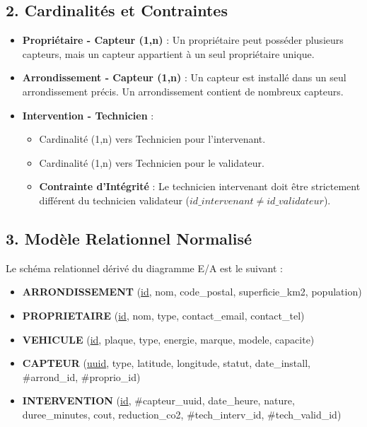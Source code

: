 \documentclass[a4paper,12pt]{article}
\begin{document}
\subsection*{2. Cardinalités et Contraintes}
\begin{itemize}
    \item \textbf{Propriétaire - Capteur (1,n)} : Un propriétaire peut posséder plusieurs capteurs, mais un capteur appartient à un seul propriétaire unique.
    \item \textbf{Arrondissement - Capteur (1,n)} : Un capteur est installé dans un seul arrondissement précis. Un arrondissement contient de nombreux capteurs.
    \item \textbf{Intervention - Technicien} : 
    \begin{itemize}
        \item Cardinalité (1,n) vers Technicien pour l'intervenant.
        \item Cardinalité (1,n) vers Technicien pour le validateur.
        \item \textbf{Contrainte d'Intégrité} : Le technicien intervenant doit être strictement différent du technicien validateur ($id\_intervenant \neq id\_validateur$).
    \end{itemize}
\end{itemize}

\subsection*{3. Modèle Relationnel Normalisé}
Le schéma relationnel dérivé du diagramme E/A est le suivant :

\begin{itemize}
    \item \textbf{ARRONDISSEMENT} (\underline{id}, nom, code\_postal, superficie\_km2, population)
    \item \textbf{PROPRIETAIRE} (\underline{id}, nom, type, contact\_email, contact\_tel)
    \item \textbf{VEHICULE} (\underline{id}, plaque, type, energie, marque, modele, capacite)
    \item \textbf{CAPTEUR} (\underline{uuid}, type, latitude, longitude, statut, date\_install, \#arrond\_id, \#proprio\_id)
    \item \textbf{INTERVENTION} (\underline{id}, \#capteur\_uuid, date\_heure, nature, duree\_minutes, cout, reduction\_co2, \#tech\_interv\_id, \#tech\_valid\_id)
\end{itemize}
\end{document}
